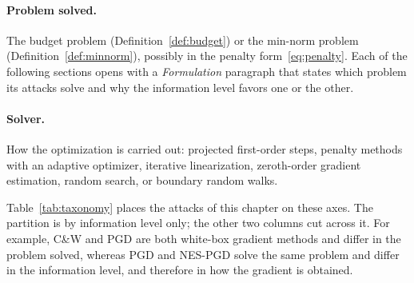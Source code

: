 \documentclass[10pt,a4paper]{extarticle}
\theoremstyle{definition}
\begin{document}
\paragraph{Problem solved.} The budget problem (Definition~\ref{def:budget}) or the min-norm problem (Definition~\ref{def:minnorm}), possibly in the penalty form~\eqref{eq:penalty}. Each of the following sections opens with a \emph{Formulation} paragraph that states which problem its attacks solve and why the information level favors one or the other.

\paragraph{Solver.} How the optimization is carried out: projected first-order steps, penalty methods with an adaptive optimizer, iterative linearization, zeroth-order gradient estimation, random search, or boundary random walks.

Table~\ref{tab:taxonomy} places the attacks of this chapter on these axes. The partition is by information level only; the other two columns cut across it. For example, C\&W and PGD are both white-box gradient methods and differ in the problem solved, whereas PGD and NES-PGD solve the same problem and differ in the information level, and therefore in how the gradient is obtained.
\end{document}
